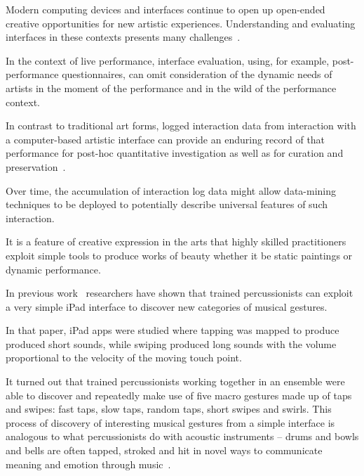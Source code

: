 \documentclass{sigchi}
\begin{document}
Modern computing devices and interfaces continue to open up open-ended
creative opportunities for new artistic experiences. Understanding and
evaluating interfaces in these contexts presents many
challenges~\cite{Resnick:2005yu,Shneiderman:2007qv}.

In the context of live performance, interface evaluation, using, for
example, post-performance questionnaires, can omit consideration of
the dynamic needs of artists in the moment of the performance and in
the wild of the performance context. 

In contrast to traditional art forms, logged interaction data from
interaction with a computer-based artistic interface can provide an
enduring record of that performance for post-hoc quantitative
investigation as well as for curation and
preservation~\cite{England:2014ys}. 

Over time, the accumulation of
interaction log data might allow data-mining techniques to be deployed
to potentially describe universal features of such interaction.


It is a feature of creative expression in the arts that highly skilled
practitioners exploit simple tools to produce works of beauty whether
it be static paintings or dynamic performance. 

In previous work~\cite{Martin:2014cr} researchers have shown that
trained percussionists can exploit a very simple iPad interface to
discover new categories of musical gestures.

In that paper, iPad apps
were studied where tapping was mapped to produce produced short
sounds, while swiping produced long sounds with the volume
proportional to the velocity of the moving touch point. 

It turned out that trained percussionists working together in an
ensemble were able to discover and repeatedly make use of five macro
gestures made up of taps and swipes: fast taps, slow taps, random
taps, short swipes and swirls. This process of discovery of
interesting musical gestures from a simple interface is analogous to
what percussionists do with acoustic instruments -- drums and bowls
and bells are often tapped, stroked and hit in novel ways to
communicate meaning and emotion through music~\cite{Schick:2006fk}.
\end{document}
